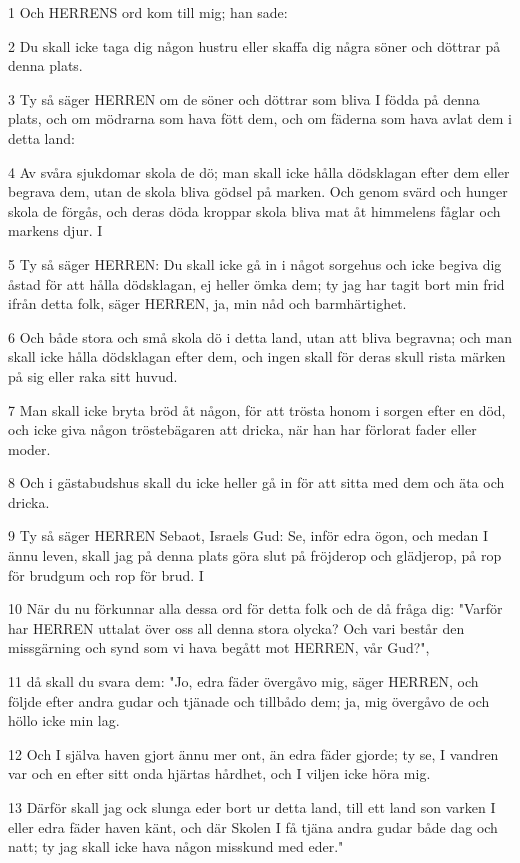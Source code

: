 \par 1 Och HERRENS ord kom till mig; han sade:
\par 2 Du skall icke taga dig någon hustru eller skaffa dig några söner och döttrar på denna plats.
\par 3 Ty så säger HERREN om de söner och döttrar som bliva I födda på denna plats, och om mödrarna som hava fött dem, och om fäderna som hava avlat dem i detta land:
\par 4 Av svåra sjukdomar skola de dö; man skall icke hålla dödsklagan efter dem eller begrava dem, utan de skola bliva gödsel på marken. Och genom svärd och hunger skola de förgås, och deras döda kroppar skola bliva mat åt himmelens fåglar och markens djur. I
\par 5 Ty så säger HERREN: Du skall icke gå in i något sorgehus och icke begiva dig åstad för att hålla dödsklagan, ej heller ömka dem; ty jag har tagit bort min frid ifrån detta folk, säger HERREN, ja, min nåd och barmhärtighet.
\par 6 Och både stora och små skola dö i detta land, utan att bliva begravna; och man skall icke hålla dödsklagan efter dem, och ingen skall för deras skull rista märken på sig eller raka sitt huvud.
\par 7 Man skall icke bryta bröd åt någon, för att trösta honom i sorgen efter en död, och icke giva någon tröstebägaren att dricka, när han har förlorat fader eller moder.
\par 8 Och i gästabudshus skall du icke heller gå in för att sitta med dem och äta och dricka.
\par 9 Ty så säger HERREN Sebaot, Israels Gud: Se, inför edra ögon, och medan I ännu leven, skall jag på denna plats göra slut på fröjderop och glädjerop, på rop för brudgum och rop för brud. I
\par 10 När du nu förkunnar alla dessa ord för detta folk och de då fråga dig: "Varför har HERREN uttalat över oss all denna stora olycka? Och vari består den missgärning och synd som vi hava begått mot HERREN, vår Gud?",
\par 11 då skall du svara dem: "Jo, edra fäder övergåvo mig, säger HERREN, och följde efter andra gudar och tjänade och tillbådo dem; ja, mig övergåvo de och höllo icke min lag.
\par 12 Och I själva haven gjort ännu mer ont, än edra fäder gjorde; ty se, I vandren var och en efter sitt onda hjärtas hårdhet, och I viljen icke höra mig.
\par 13 Därför skall jag ock slunga eder bort ur detta land, till ett land son varken I eller edra fäder haven känt, och där Skolen I få tjäna andra gudar både dag och natt; ty jag skall icke hava någon misskund med eder."
